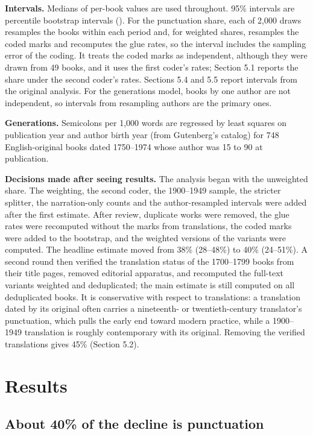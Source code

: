 \documentclass[
  11pt,
]{article}
\begin{document}
\textbf{Intervals.} Medians of per-book values are used throughout. 95\% intervals are percentile bootstrap intervals (). For the punctuation share, each of 2,000
draws resamples the books within each period and, for weighted shares, resamples the coded marks and recomputes the glue rates, so the interval includes the sampling error of the coding. It treats the
coded marks as independent, although they were drawn from 49 books, and it uses the first coder's rates; Section 5.1 reports the share under the second coder's rates. Sections 5.4 and 5.5 report
intervals from the original analysis. For the generations model, books by one author are not independent, so intervals from resampling authors are the primary ones.

\textbf{Generations.} Semicolons per 1,000 words are regressed by least squares on publication year and author birth year (from Gutenberg's catalog) for 748 English-original books dated 1750--1974
whose author was 15 to 90 at publication.

\textbf{Decisions made after seeing results.} The analysis began with the unweighted share. The weighting, the second coder, the 1900--1949 sample, the stricter splitter, the narration-only counts and
the author-resampled intervals were added after the first estimate. After review, duplicate works were removed, the glue rates were recomputed without the marks from translations, the coded marks were
added to the bootstrap, and the weighted versions of the variants were computed. The headline estimate moved from 38\% (28--48\%) to 40\% (24--51\%). A second round then verified the translation
status of the 1700--1799 books from their title pages, removed editorial apparatus, and recomputed the full-text variants weighted and deduplicated; the main estimate is still computed on all
deduplicated books. It is conservative with respect to translations: a translation dated by its original often carries a nineteenth- or twentieth-century translator's punctuation, which pulls the
early end toward modern practice, while a 1900--1949 translation is roughly contemporary with its original. Removing the verified translations gives 45\% (Section 5.2).

\section{Results}\label{results}

\subsection{About 40\% of the decline is punctuation}\label{about-40-of-the-decline-is-punctuation}
\end{document}
